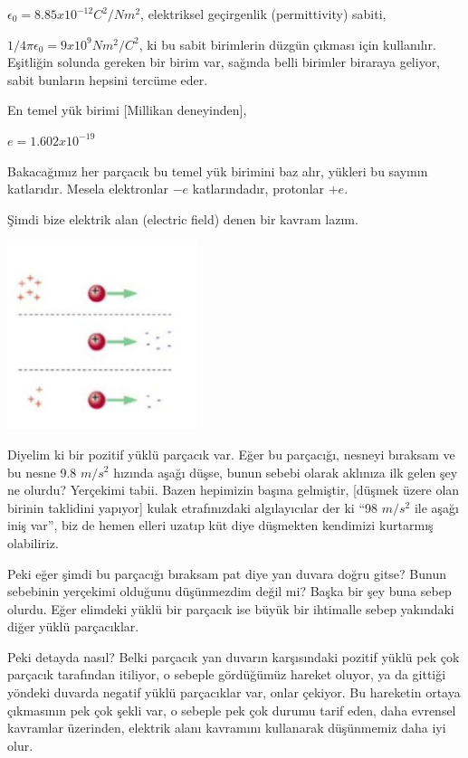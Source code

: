 \documentclass[12pt,fleqn]{article}\usepackage{../../common}
\begin{document}
$\epsilon_0 = 8.85 x 10^{-12} C^2/N m^2$, elektriksel geçirgenlik
(permittivity) sabiti,

$1/4\pi \epsilon_0 = 9 x 10^9 N m^2 /C^2$, ki bu sabit birimlerin düzgün
çıkması için kullanılır. Eşitliğin solunda gereken bir birim var, sağında
belli birimler biraraya geliyor, sabit bunların hepsini tercüme eder.

En temel yük birimi [Millikan deneyinden], 

$ e = 1.602 x 10^{-19}$

Bakacağımız her parçacık bu temel yük birimini baz alır, yükleri bu sayının
katlarıdır. Mesela elektronlar $-e$ katlarındadır, protonlar $+e$.

Şimdi bize elektrik alan (electric field) denen bir kavram lazım. 

\includegraphics[width=15em]{elecmag_04.png}

Diyelim ki bir pozitif yüklü parçacık var. Eğer bu parçacığı, nesneyi
bıraksam ve bu nesne 9.8 $m/s^2$ hızında aşağı düşse, bunun sebebi olarak
aklınıza ilk gelen şey ne olurdu? Yerçekimi tabii. Bazen hepimizin başına
gelmiştir, [düşmek üzere olan birinin taklidini yapıyor] kulak
etrafınızdaki algılayıcılar der ki ``98 $m/s^2$ ile aşağı iniş var'', biz
de hemen elleri uzatıp küt diye düşmekten kendimizi kurtarmış olabiliriz.

Peki eğer şimdi bu parçacığı bıraksam pat diye yan duvara doğru gitse?
Bunun sebebinin yerçekimi olduğunu düşünmezdim değil mi? Başka bir şey buna
sebep olurdu. Eğer elimdeki yüklü bir parçacık ise büyük bir ihtimalle
sebep yakındaki diğer yüklü parçacıklar.

Peki detayda nasıl? Belki parçacık yan duvarın karşısındaki pozitif yüklü
pek çok parçacık tarafından itiliyor, o sebeple gördüğümüz hareket oluyor,
ya da gittiği yöndeki duvarda negatif yüklü parçacıklar var, onlar
çekiyor. Bu hareketin ortaya çıkmasının pek çok şekli var, o sebeple pek
çok durumu tarif eden, daha evrensel kavramlar üzerinden, elektrik alanı
kavramını kullanarak düşünmemiz daha iyi olur.
\end{document}
